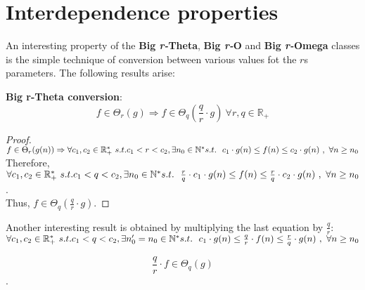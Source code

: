 \section{Interdependence properties}
An interesting property of the \textbf{Big \textit{r-}Theta},  \textbf{Big \textit{r-}O} and \textbf{Big \textit{r-}Omega} classes is the simple technique of conversion between various values fot the $r$s parameters. The following results arise:

\begin{theorem}
    \textbf{Big r-Theta conversion}:
    \[  f \in \Theta_{r}(g) \Rightarrow f \in \Theta_{q} \left( \frac{q}{r} \cdot g \right) \ \forall r,q \in \mathbb{R}_{+}\]
\end{theorem}

\begin{proof}
    $ f \in \Theta_{r}(g(n)) \Rightarrow \forall c_{1}, c_{2} \in \mathbb{R}^{*}_{+} \ s.t. c_{1}< r < c_{2} , \exists n_{0} \in \mathbb{N}^{*}\ \\ s.t.\ \ c_{1} \cdot g(n) \leq f(n) \leq c_{2} \cdot g(n)\ ,\  \forall n \geq n_{0} $ \\
    Therefore, $\forall c_{1}, c_{2} \in \mathbb{R}^{*}_{+} \ s.t. c_{1} < q < c_{2} , \exists n_{0} \in \mathbb{N}^{*}\ \\ s.t.\ \ \frac{r}{q} \cdot c_{1} \cdot g(n) \leq f(n) \leq \frac{r}{q} \cdot c_{2} \cdot g(n)\ ,\  \forall n \geq n_{0}$. \\
    Thus, $f \in \Theta_{q} \left( \frac{q}{r} \cdot g \right)$.
\end{proof}

Another interesting result is obtained by multiplying the last equation by $\frac{q}{r}$: \\
$\forall c_{1}, c_{2} \in \mathbb{R}^{*}_{+} \ s.t. c_{1} < q < c_{2} , \exists n_{0}' = n_{0} \in \mathbb{N}^{*}\ \\ s.t.\ \ c_{1} \cdot g(n) \leq \frac{q}{r} \cdot f(n) \leq \frac{r}{q} \cdot g(n)\ ,\  \forall n \geq n_{0}$
\begin{corollary}
    \[ \frac{q}{r} \cdot f \in \Theta_{q} \left( g \right)\].
\end{corollary}




